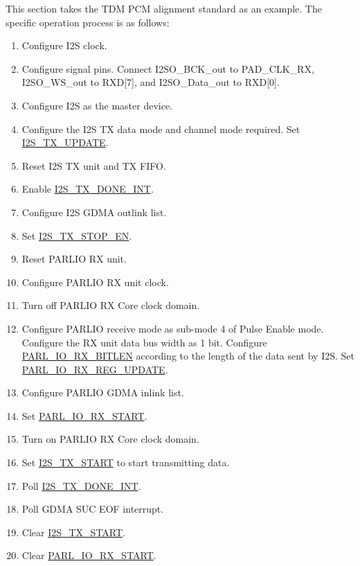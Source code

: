 \documentclass[main\_\_EN.tex]{subfiles}
\begin{document}
This section takes the TDM PCM alignment standard as an example. The specific operation process is as follows:

\begin{enumerate}
    \item Configure I2S clock.
    \item Configure signal pins. Connect I2SO\_BCK\_out to PAD\_CLK\_RX, I2SO\_WS\_out to RXD[7], and I2SO\_Data\_out to RXD[0].
    \item Configure I2S as the master device.
    \item Configure the I2S TX data mode and channel mode required. Set \hyperref[fielddesc:I2STXUPDATE]{I2S\_TX\_UPDATE}.
    \item Reset I2S TX unit and TX FIFO.
    \item Enable \hyperref[int:I2STXDONEINT]{I2S\_TX\_DONE\_INT}. 
    \item Configure I2S GDMA outlink list.
    \item Set \hyperref[fielddesc:I2STXSTOPEN]{I2S\_TX\_STOP\_EN}.
    \item Reset PARLIO RX unit.
    \item Configure PARLIO RX unit clock.
    \item Turn off PARLIO RX Core clock domain.
    \item Configure PARLIO receive mode as sub-mode 4 of Pulse Enable mode. Configure the RX unit data bus width as 1 bit. Configure \hyperref[fielddesc:PARLIORXBITLEN]{PARL\_IO\_RX\_BITLEN} according to the length of the data sent by I2S. Set \hyperref[fielddesc:PARLIORXREGUPDATE]{PARL\_IO\_RX\_REG\_UPDATE}.
    \item Configure PARLIO GDMA inlink list.
    \item Set \hyperref[fielddesc:PARLIORXSTART]{PARL\_IO\_RX\_START}.
    \item Turn on PARLIO RX Core clock domain.
    \item Set \hyperref[fielddesc:I2STXSTART]{I2S\_TX\_START} to start transmitting data.
    \item Poll \hyperref[int:I2STXDONEINT]{I2S\_TX\_DONE\_INT}. 
    \item Poll GDMA SUC EOF interrupt.
    \item Clear \hyperref[fielddesc:I2STXSTART]{I2S\_TX\_START}.
    \item Clear \hyperref[fielddesc:PARLIORXSTART]{PARL\_IO\_RX\_START}.
\end{enumerate}
\end{document}
